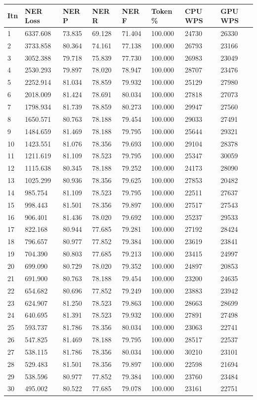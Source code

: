 \documentclass[12pt,a4paper,]{scrartcl}
\begin{document}
\begin{longtable}[]{@{}llllllll@{}}
\toprule
Itn & NER Loss & NER P & NER R & NER F & Token \% & CPU WPS & GPU WPS\tabularnewline
\midrule
\endhead
1 & 6337.608 & 73.835 & 69.128 & 71.404 & 100.000 & 24730 & 26330\tabularnewline
2 & 3733.858 & 80.364 & 74.161 & 77.138 & 100.000 & 26793 & 23166\tabularnewline
3 & 3052.388 & 79.718 & 75.839 & 77.730 & 100.000 & 26983 & 23049\tabularnewline
4 & 2530.293 & 79.897 & 78.020 & 78.947 & 100.000 & 28707 & 23476\tabularnewline
5 & 2252.914 & 81.034 & 78.859 & 79.932 & 100.000 & 25129 & 27980\tabularnewline
6 & 2018.009 & 81.424 & 78.691 & 80.034 & 100.000 & 27818 & 27073\tabularnewline
7 & 1798.934 & 81.739 & 78.859 & 80.273 & 100.000 & 29947 & 27560\tabularnewline
8 & 1650.571 & 80.763 & 78.188 & 79.454 & 100.000 & 29033 & 27491\tabularnewline
9 & 1484.659 & 81.469 & 78.188 & 79.795 & 100.000 & 25644 & 29321\tabularnewline
10 & 1423.551 & 81.076 & 78.356 & 79.693 & 100.000 & 29104 & 28378\tabularnewline
11 & 1211.619 & 81.109 & 78.523 & 79.795 & 100.000 & 25347 & 30059\tabularnewline
12 & 1115.638 & 80.345 & 78.188 & 79.252 & 100.000 & 24173 & 28090\tabularnewline
13 & 1025.299 & 80.936 & 78.356 & 79.625 & 100.000 & 27853 & 20482\tabularnewline
14 & 985.754 & 81.109 & 78.523 & 79.795 & 100.000 & 22511 & 27637\tabularnewline
15 & 998.443 & 81.501 & 78.356 & 79.897 & 100.000 & 27517 & 27543\tabularnewline
16 & 906.401 & 81.436 & 78.020 & 79.692 & 100.000 & 25237 & 29533\tabularnewline
17 & 822.168 & 80.944 & 77.685 & 79.281 & 100.000 & 27192 & 28424\tabularnewline
18 & 796.657 & 80.977 & 77.852 & 79.384 & 100.000 & 23619 & 23841\tabularnewline
19 & 704.390 & 80.803 & 77.685 & 79.213 & 100.000 & 23415 & 24997\tabularnewline
20 & 699.090 & 80.729 & 78.020 & 79.352 & 100.000 & 24897 & 20853\tabularnewline
21 & 691.900 & 80.763 & 78.188 & 79.454 & 100.000 & 23200 & 24635\tabularnewline
22 & 654.682 & 80.696 & 77.852 & 79.249 & 100.000 & 23883 & 23942\tabularnewline
23 & 624.907 & 81.250 & 78.523 & 79.863 & 100.000 & 28663 & 28699\tabularnewline
24 & 640.695 & 81.391 & 78.523 & 79.932 & 100.000 & 27891 & 27498\tabularnewline
25 & 593.737 & 81.786 & 78.356 & 80.034 & 100.000 & 23063 & 22741\tabularnewline
26 & 547.825 & 81.469 & 78.188 & 79.795 & 100.000 & 28517 & 22537\tabularnewline
27 & 538.115 & 81.786 & 78.356 & 80.034 & 100.000 & 30210 & 23101\tabularnewline
28 & 529.483 & 81.501 & 78.356 & 79.897 & 100.000 & 22598 & 21694\tabularnewline
29 & 538.596 & 80.977 & 77.852 & 79.384 & 100.000 & 23760 & 23484\tabularnewline
30 & 495.002 & 80.522 & 77.685 & 79.078 & 100.000 & 23161 & 22751\tabularnewline
\bottomrule
\end{longtable}
\end{document}
